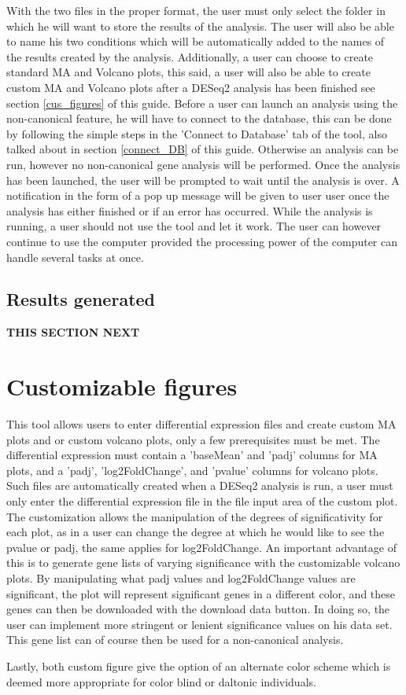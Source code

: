 \documentclass[11pt]{article}
\begin{document}
With the two files in the proper format, the user must only select the folder in which he will want to store the results of the analysis. The user will also be able to name his two conditions which will be automatically added to the names of the results created by the analysis. Additionally, a user can choose to create standard MA and Volcano plots, this said, a user will also be able to create custom MA and Volcano plots after a DESeq2 analysis has been finished see section \ref{cus_figures} of this guide.
Before a user can launch an analysis using the non-canonical feature, he will have to connect to the database, this can be done by following the simple steps in the 'Connect to Database' tab of the tool, also talked about in section \ref{connect_DB} of this guide. Otherwise an analysis can be run, however no non-canonical gene analysis will be performed.
Once the analysis has been launched, the user will be prompted to wait until the analysis is over. A notification in the form of a pop up message will be given to user user once the analysis has either finished or if an error has occurred. While the analysis is running, a user should not use the tool and let it work. The user can however continue to use the computer provided the processing power of the computer can handle several tasks at once.
                     
\subsection{Results generated \label{results_DESeq2}}                     
\textbf{THIS SECTION NEXT}
\section{Customizable figures \label{cus_figures}}
This tool allows users to enter differential expression files and create custom MA plots and or custom volcano plots, only a few prerequisites must be met. The differential expression must contain a 'baseMean' and 'padj' columns for MA plots, and a 'padj', 'log2FoldChange', and 'pvalue' columns for volcano plots. Such files are automatically created when a DESeq2 analysis is run, a user must only enter the differential expression file in the file input area of the custom plot.
The customization allows the manipulation of the degrees of significativity for each plot, as in a user can change the degree at which he would like to see the pvalue or padj, the same applies for log2FoldChange.
An important advantage of this is to generate gene lists of varying significance with the customizable volcano plots. By manipulating what padj values and log2FoldChange values are significant, the plot will represent significant genes in a different color, and these genes can then be downloaded with the download data button. In doing so, the user can implement more stringent or lenient significance values on his data set. This gene list can of course then be used for a non-canonical analysis.

Lastly, both custom figure give the option of an alternate color scheme which is deemed more appropriate for color blind or daltonic individuals.




\end{document}
